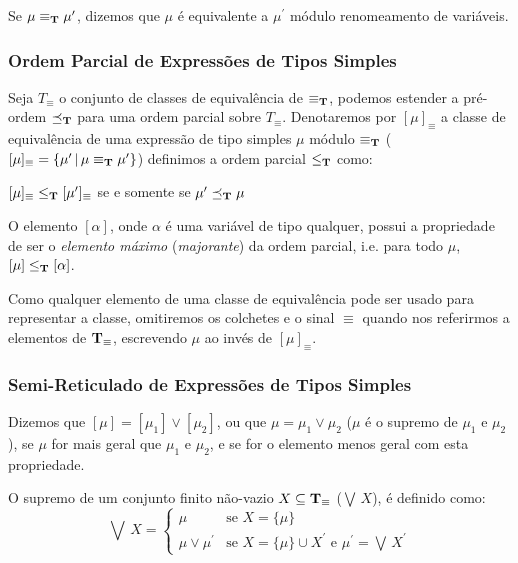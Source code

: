 Se $\mu\equiv_{\text{\textbf{T}}}\mu^{\prime}$, dizemos que $\mu$ \'e equivalente a $\mu^{\prime}$ m\'odulo renomeamento
de vari\'aveis.

\subsubsection{Ordem Parcial de Express\~oes de Tipos Simples}

Seja $T_{\equiv}$ o conjunto de classes de equival\^encia de $\equiv_{\text{\textbf{T}}}$, podemos estender a pr\'e-ordem
$\preceq_{\text{\textbf{T}}}$ para uma ordem parcial sobre $T_{\equiv}$. Denotaremos por $[\mu]_{\equiv}$ a classe de
equival\^encia de uma express\~ao de tipo simples $\mu$ m\'odulo $\equiv_{\text{\textbf{T}}}$ 
($[\mu]_{\equiv}=\{\mu^{\prime}\,|\,\mu\equiv_{\text{\textbf{T}}}\mu^{\prime}\}$) definimos a ordem parcial 
$\leq_{\text{\textbf{T}}}$ como:
\begin{center}
	$[\mu]_{\equiv}\leq_{\text{\textbf{T}}}[\mu^{\prime}]_{\equiv}$ se e somente se 
	$\mu^{\prime}\preceq_{\text{\textbf{T}}}\mu$
\end{center}

O elemento $[\alpha]$, onde $\alpha$ \'e uma vari\'avel de tipo qualquer, possui a propriedade de ser o 
\emph{elemento m\'aximo} (\emph{majorante}) da ordem parcial, i.e. para todo $\mu$, 
$[\mu]\leq_{\text{\textbf{T}}}[\alpha]$.

Como qualquer elemento de uma classe de equival\^encia pode ser usado para representar a classe, omitiremos os colchetes
e o sinal $\equiv$ quando nos referirmos a elementos de $\text{\textbf{T}}_{\equiv}$, escrevendo $\mu$ ao inv\'es de 
$[\mu]_{\equiv}$.

\subsubsection{Semi-Reticulado de Express\~oes de Tipos Simples}\label{rettiposimples}

Dizemos que $[\mu]=[\mu_{1}]\lor[\mu_{2}]$, ou que $\mu=\mu_{1}\lor\mu_{2}$ ($\mu$ \'e o supremo de $\mu_{1}$ e 
$\mu_{2}$), se $\mu$ for mais geral que $\mu_{1}$ e $\mu_{2}$, e se for o elemento menos geral com esta propriedade.

O supremo de um conjunto finito n\~ao-vazio $X\subseteq\text{\textbf{T}}_{\equiv}$ ($\bigvee\,X$), \'e definido 
como:
\begin{equation*}
	\bigvee\,X=\left\{
					\begin{array}{ll}
					   \mu                 & \text{se } X=\{\mu\}\\
					   \mu\lor\mu^{\prime} & \text{se } X=\{\mu\}\cup X^{\prime}
					                         \text{ e }\mu^{\prime}=\bigvee\,X^{\prime} 
					\end{array}
	           \right.
\end{equation*}

